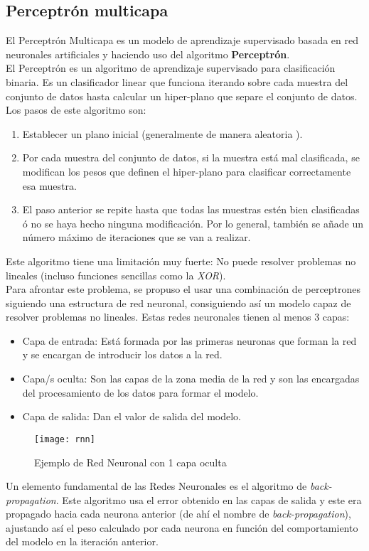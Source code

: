 \subsection{Perceptrón multicapa}
El Perceptrón Multicapa es un modelo de aprendizaje supervisado basada en red neuronales artificiales y haciendo uso del algoritmo \textbf{Perceptrón}.\\
\linebreak
El Perceptrón es un algoritmo de aprendizaje supervisado para clasificación binaria. Es un clasificador linear que funciona iterando sobre cada muestra del conjunto de datos hasta calcular un hiper-plano que separe el conjunto de datos. Los pasos de este algoritmo son:
\begin{enumerate}
	\item Establecer un plano inicial (generalmente de manera aleatoria ).
	\item Por cada muestra del conjunto de datos, si la muestra está mal clasificada, se modifican los pesos que definen el hiper-plano para clasificar correctamente esa muestra.
	\item El paso anterior se repite hasta que todas las muestras estén bien clasificadas ó no se haya hecho ninguna modificación. Por lo general, también se añade un número máximo de iteraciones que se van a realizar.
\end{enumerate}
Este algoritmo tiene una limitación muy fuerte: No puede resolver problemas no lineales (incluso funciones sencillas como la \textit{XOR}). \\
\linebreak
Para afrontar este problema, se propuso el usar una combinación de perceptrones siguiendo una estructura de red neuronal, consiguiendo así un modelo capaz de resolver problemas no lineales. Estas redes neuronales tienen al menos 3 capas:
\begin{itemize}
	\item Capa de entrada: Está formada por las primeras neuronas que forman la red y se encargan de introducir los datos a la red.
	\item Capa/s oculta: Son las capas de la zona media de la red y son las encargadas del procesamiento de los datos para formar el modelo.
	\item Capa de salida: Dan el valor de salida del modelo.
\end{itemize}
\begin{figure}[H]
	\centering
	\texttt{[image: rnn]}
	\caption{Ejemplo de Red Neuronal con 1 capa oculta}
	\label{fig:rnn}
\end{figure}
Un elemento fundamental de las Redes Neuronales es el algoritmo de \textit{back-propagation}. Este algoritmo usa el error obtenido en las capas de salida y este era propagado hacia cada neurona anterior (de ahí el nombre de \textit{back-propagation}), ajustando así el peso calculado por cada neurona en función del comportamiento del modelo en la iteración anterior.
